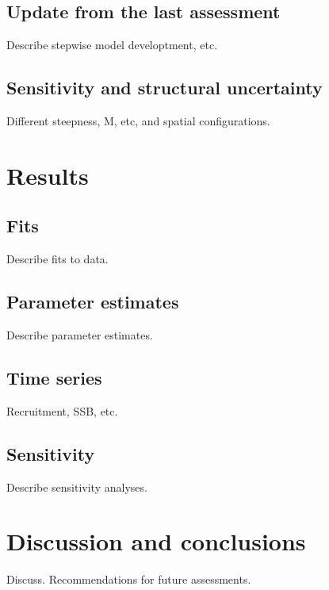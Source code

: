 \documentclass[
]{scrartcl}
\begin{document}
\subsection{Update from the last
assessment}\label{update-from-the-last-assessment}

Describe stepwise model developtment, etc.

\subsection{Sensitivity and structural
uncertainty}\label{sensitivity-and-structural-uncertainty}

Different steepness, M, etc, and spatial configurations.

\section{Results}\label{results}

\subsection{Fits}\label{fits}

Describe fits to data.

\subsection{Parameter estimates}\label{parameter-estimates}

Describe parameter estimates.

\subsection{Time series}\label{time-series}

Recruitment, SSB, etc.

\subsection{Sensitivity}\label{sensitivity}

Describe sensitivity analyses.

\section{Discussion and conclusions}\label{discussion-and-conclusions}

Discuss. Recommendations for future assessments.
\end{document}
